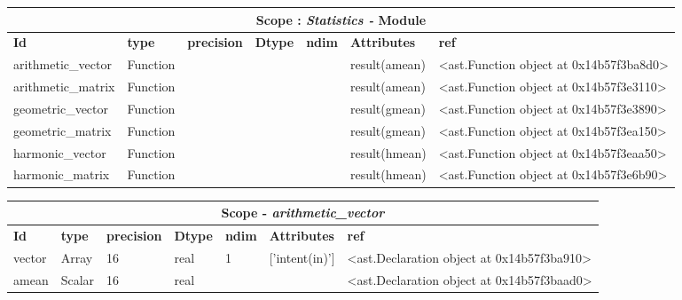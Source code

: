 \documentclass{report}
\begin{document}
\begin{center}
\begin{longtable}{|p{3.5cm}|p{1.5cm}|p{1.5cm}|p{1.5cm}|p{1cm}|p{2cm}|p{4cm}| }
\hline
\multicolumn{7}{|c|}{\textbf{Scope : \qquad}  \textbf{\textit{Statistics - }Module}}\\ 
\hline
\textbf{Id} & \textbf{type} & \textbf{precision} & \textbf{Dtype} & \textbf{ndim} & \textbf{Attributes} & \textbf{ref} \\\hline

arithmetic\_vector & Function &  &  &  & result(amean) & <ast.Function object at 0x14b57f3ba8d0> \\\hline

arithmetic\_matrix & Function &  &  &  & result(amean) & <ast.Function object at 0x14b57f3e3110> \\\hline

geometric\_vector & Function &  &  &  & result(gmean) & <ast.Function object at 0x14b57f3e3890> \\\hline

geometric\_matrix & Function &  &  &  & result(gmean) & <ast.Function object at 0x14b57f3ea150> \\\hline

harmonic\_vector & Function &  &  &  & result(hmean) & <ast.Function object at 0x14b57f3eaa50> \\\hline

harmonic\_matrix & Function &  &  &  & result(hmean) & <ast.Function object at 0x14b57f3e6b90> \\\hline

\end{longtable}
\end{center}

 \vspace{1cm}

\begin{center}
\begin{longtable}{|p{3.5cm}|p{1.5cm}|p{1.5cm}|p{1.5cm}|p{1cm}|p{2cm}|p{4cm}| }
\hline
\multicolumn{7}{|c|}{\textbf{Scope} -  \textbf{\textit{arithmetic\_vector}}} \\ 
\hline
\textbf{Id} & \textbf{type} & \textbf{precision} & \textbf{Dtype} & \textbf{ndim} & \textbf{Attributes} & \textbf{ref} \\\hline

vector & Array & 16 & real & 1 & ['intent(in)'] & <ast.Declaration object at 0x14b57f3ba910> \\\hline

amean & Scalar & 16 & real &  &  & <ast.Declaration object at 0x14b57f3baad0> \\\hline

\end{longtable}
\end{center}
\end{document}
